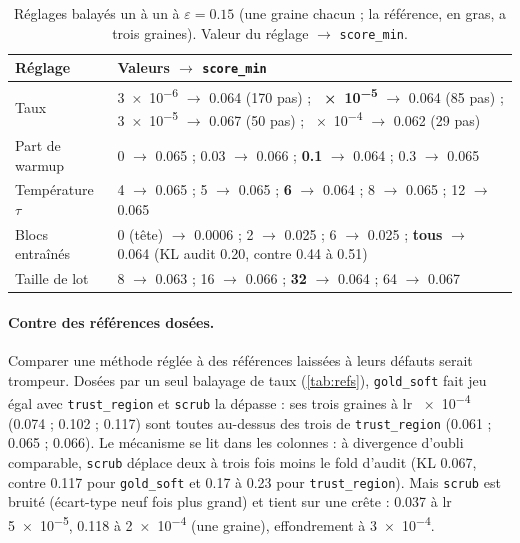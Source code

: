 \documentclass[11pt,a4paper]{article}
\newcommand{\code}[1]{\texttt{#1}}
\begin{document}
\begin{table}[ht]
  \centering\small
  \caption{Réglages balayés un à un à $\varepsilon=\num{0.15}$ (une graine chacun ; la référence,
  en gras, a trois graines). Valeur du réglage $\to$ \code{score\_min}.}
  \label{tab:reglages}
  \begin{tabularx}{\linewidth}{@{}>{\raggedright}p{2.9cm}X@{}}
    \toprule
    Réglage & Valeurs $\to$ \code{score\_min}\\
    \midrule
    Taux & \num{3e-6} $\to$ \num{0.064} (170 pas) ; \textbf{\num{e-5}} $\to$ \num{0.064} (85 pas) ;
      \num{3e-5} $\to$ \num{0.067} (50 pas) ; \num{e-4} $\to$ \num{0.062} (29 pas)\\
    Part de warmup & 0 $\to$ \num{0.065} ; \num{0.03} $\to$ \num{0.066} ; \textbf{\num{0.1}} $\to$
      \num{0.064} ; \num{0.3} $\to$ \num{0.065}\\
    Température $\tau$ & 4 $\to$ \num{0.065} ; 5 $\to$ \num{0.065} ; \textbf{6} $\to$ \num{0.064} ;
      8 $\to$ \num{0.065} ; 12 $\to$ \num{0.065}\\
    Blocs entraînés & 0 (tête) $\to$ \num{0.0006} ; 2 $\to$ \num{0.025} ; 6 $\to$ \num{0.025} ;
      \textbf{tous} $\to$ \num{0.064} (KL audit \num{0.20}, contre \num{0.44} à \num{0.51})\\
    Taille de lot & 8 $\to$ \num{0.063} ; 16 $\to$ \num{0.066} ; \textbf{32} $\to$ \num{0.064} ;
      64 $\to$ \num{0.067}\\
    \bottomrule
  \end{tabularx}
\end{table}

\paragraph{Contre des références dosées.} Comparer une méthode réglée à des références laissées à
leurs défauts serait trompeur. Dosées par un seul balayage de taux (\cref{tab:refs}),
\code{gold\_soft} fait jeu égal avec \code{trust\_region} et \code{scrub} la dépasse : ses trois
graines à lr \num{e-4} (\num{0.074} ; \num{0.102} ; \num{0.117}) sont toutes au-dessus des trois de
\code{trust\_region} (\num{0.061} ; \num{0.065} ; \num{0.066}). Le mécanisme se lit dans les
colonnes : à divergence d'oubli comparable, \code{scrub} déplace deux à trois fois moins le fold
d'audit (KL \num{0.067}, contre \num{0.117} pour \code{gold\_soft} et \num{0.17} à \num{0.23} pour
\code{trust\_region}). Mais \code{scrub} est bruité (écart-type neuf fois plus grand) et tient sur
une crête : \num{0.037} à lr \num{5e-5}, \num{0.118} à \num{2e-4} (une graine), effondrement à
\num{3e-4}.
\end{document}
